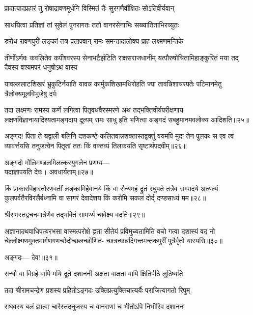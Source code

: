 \twolineshloka
{प्रादात्पादप्रहारं तु रोषाद्रावणमूर्धनि}
{विस्मितं तैः सुरगणैर्वीक्षितः सोऽतिवीर्यवान्} %

\twolineshloka
{साधयित्वा प्रतिज्ञां तां सुवेलं पुनरागतः}
{ततो वानरसेनाभिः सख्यातिताभिरच्युतः} %

\twolineshloka
{रुरोध रावणपुरीं लङ्कां तत्र प्रतापवान्}
{रामः समन्तादालोक्य प्राह लक्ष्मणमन्तिके} %

\fourlineindentedshloka
{तीर्णोऽर्णवः कवलितेव कपीश्वरस्य}
{सेनाभटैर्झटिति राक्षसराजधानीम्}
{यत्पौरुषोचितामिहाङ्कुरितं मया तद्}
{दैवस्य वश्यमपरं धनुषोऽथ वास्य} %


\fourlineindentedshloka
{यावल्ललाटशिखरं भ्रुकुटिर्नयाति}
{यावन्न कार्मुकशिखामधिरोहति ज्या}
{तावन्निशाचरपतेः पटिमानमेतु}
{त्रैलोक्यमूलविभुजेषु दर्पः} %


तदा लक्ष्मणः रामस्य कर्णे लगित्वा पितृवधवैरस्मरणे अथ 
तद्भक्तिवीर्यपरीक्षणाय लक्षणविज्ञानायादिश्यतामङ्गदाय दूत्यम्
रामः साधु इति भणित्वा अङ्गदं सबहुमानमवलोक्य आदिशति॥२५॥

अङ्गद! पिता ते यद्वाली बलिनि दशकण्ठे
कलितवान्नशक्तास्तद्वक्तुं वयमपि मुदा तेन पुलकः
स एव त्वं व्यावर्त्तयसि तनुजत्वेन पितृतां 
ततः किं वक्तव्यं तिलकयति सृष्टार्थपदवीम्॥२६॥

अङ्गदो मौलिमण्डलमिलत्करयुगलेन प्रणम्य---\\
यदाज्ञापयति देवः। अवधार्यताम्॥२७॥

किं प्राकारविहारतोरणवतीं लङ्कामिहैवानये
किं वा सैन्यमहं द्रुतं रघुपते तत्रैव सम्पादये
अत्यल्पं कुलपर्वतैरविरलैर्बध्नामि वा सागरं
देवादेशय किं करोमि सकलं दोर्द् दण्डसाध्यं मम॥२८॥

श्रीरामस्तद्वचनमात्रेणैव तद्भक्तिं सामर्थ्य चावेक्ष्य वदति॥२९॥

अज्ञानादथवाधिपत्यरभसा वास्मत्परोक्षे ह्नता सीतेयं
प्रविमुच्यतामिति वचो गत्वा दशास्यं वद
नो चेल्लोक्ष्मणमुक्तमार्गणगणच्छेदोच्छलच्छोणित-
च्छत्रच्छन्नदिगन्तमन्तकपुरीं पुत्रैर्वृतो यास्यसि॥३०॥

अङ्गदः--- देव!॥३१॥

\addtocounter{shlokacount}{7}
\twolineshloka
{सन्धौ वा विग्रहे वापि मयि दूते दशाननी}
{अक्षता वाक्षता वापि क्षितिपीठे लुठिष्यति} %

\twolineshloka
{तदा श्रीरामचन्द्रेण प्रशस्य प्रहितोऽङ्गदः}
{उक्तिप्रत्युक्तिचात्यर्यैः पराजित्यागतो रिपुम्} %

\twolineshloka
{राघवस्य बलं ज्ञात्वा चारैस्तदनुजस्य च}
{वानराणां च भीतोऽपि निर्भीरिव दशाननः} %

